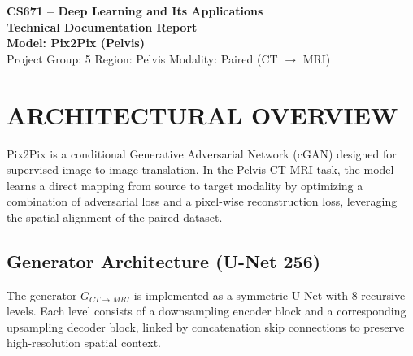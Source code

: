 \documentclass[10pt,a4paper]{article}
\begin{document}
\begin{tcolorbox}[
  enhanced,
  colback=softbg,
  colframe=brand,
  boxrule=0.9pt,
  arc=2mm,
  left=5pt,right=5pt,top=5pt,bottom=5pt
]
\centering
{\Large\bfseries\color{brand} CS671 -- Deep Learning and Its Applications}\\[2pt]
{\large\bfseries Technical Documentation Report}\\[6pt]
{\normalsize\bfseries Model: Pix2Pix (Pelvis)}\\[4pt]
\small
Project Group: 5 \quad Region: Pelvis \quad Modality: Paired (CT $\to$ MRI)
\end{tcolorbox}

\section{ARCHITECTURAL OVERVIEW}
Pix2Pix is a conditional Generative Adversarial Network (cGAN) designed for supervised image-to-image translation. In the Pelvis CT-MRI task, the model learns a direct mapping from source to target modality by optimizing a combination of adversarial loss and a pixel-wise reconstruction loss, leveraging the spatial alignment of the paired dataset.

\subsection{Generator Architecture (U-Net 256)}
The generator $G_{CT \to MRI}$ is implemented as a symmetric U-Net with 8 recursive levels. Each level consists of a downsampling encoder block and a corresponding upsampling decoder block, linked by concatenation skip connections to preserve high-resolution spatial context.
\end{document}
